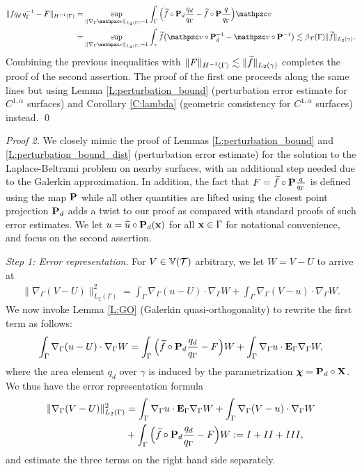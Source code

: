 %
\begin{align*}
\|f q_d \, q_\Gamma^{-1}-F\|_{H^{-1}(\Gamma)} & = \sup_{\|\nabla_\Gamma \tv\|_{L_2(\Gamma)}=1} \int_\Gamma \Big(\wf\circ \bP_d \frac{q_d}{q_\Gamma}-\wf \circ \bP \frac{q}{q_\Gamma}\Big) \tv
\\ &  = \sup_{\|\nabla_\Gamma \tv\|_{L_2(\Gamma)}=1} \int_\gamma \wf \big(\tv \circ \bP_d^{-1} - \tv \circ \bP^{-1} \big)
\lesssim \beta_\T(\Gamma) \|\wf\|_{L_2(\gamma)}.
\end{align*}
%
Combining the previous inequalities with
$\|F\|_{H^{-1}(\Gamma)} \lesssim \|\widetilde{f}\|_{L_2(\gamma)}$ completes the proof of the
second assertion. The proof of the first one proceeds along the same lines
but using Lemma \ref{L:perturbation_bound} (perturbation error estimate
for $C^{1,\alpha}$ surfaces)
and Corollary \ref{C:lambda} (geometric consistency for $C^{1,\alpha}$ surfaces)
instead.
\qed

\medskip\noindent
{\it Proof 2.}
We closely mimic the proof of Lemmas \ref{L:perturbation_bound} and \ref{L:perturbation_bound_dist} (perturbation error estimate) for the solution to the Laplace-Beltrami problem on nearby surfaces, with an additional step needed due to the Galerkin approximation. In addition, the fact that $F=\widetilde{f}\circ{\bf P} \frac{q}{q_\Gamma}$ is defined using the map ${\bf P}$ while all other quantities are lifted using the closest point projection ${\bf P}_d$ adds a twist to our proof as compared with standard proofs of such error estimates. We let $u=\widetilde{u}\circ{\bf P}_d({\bf x})$ for all ${\bf x}\in\Gamma$ for notational convenience, and focus on the second assertion.  

\medskip\noindent
{\it Step 1: Error representation}.
For $V \in \mathbb{V}(\mathcal{T})$ arbitrary, we let $W=V-U$ %
to arrive at
%
\begin{align*} 
\| \nabla_\Gamma (V-U)\|_{L_2(\Gamma)}^2 = \int_\Gamma \nabla_\Gamma (u-U)\cdot \nabla_\Gamma W + \int_\Gamma \nabla_\Gamma (V-u) \cdot \nabla_\Gamma W.
\end{align*}
%
We now invoke Lemma \ref{L:GO} (Galerkin quasi-orthogonality) to rewrite the first
term as follows:
%
\[
\int_\Gamma \nabla_\Gamma (u-U)\cdot \nabla_\Gamma W
= \int_\Gamma \Big(\widetilde{f}\circ{\bf P}_d \frac{q_d}{q_\Gamma}-F \Big) W
+ \int_\Gamma \nabla_\Gamma u \cdot {\bf E}_\Gamma \nabla_\Gamma W,
\]
%
where the area element $q_d$ over $\gamma$ is induced by the parametrization
${\boldsymbol \chi} = {\bf P}_d\circ{\bf X}$. We thus have the error representation formula
%
\begin{align*}
\| \nabla_\Gamma (V-U)\|_{L_2(\Gamma)}^2 & = \int_\Gamma \nabla_\Gamma u \cdot {\bf E}_{\Gamma} \nabla_\Gamma W + \int_\Gamma \nabla_\Gamma (V-u) \cdot \nabla_\Gamma W \\
& + \int_\Gamma \Big(\widetilde{f} \circ {\bf P}_d \frac{q_d}{q_\Gamma}-F\Big) W := I+II+III,
\end{align*}
%
and estimate the three terms on the right hand side separately.


